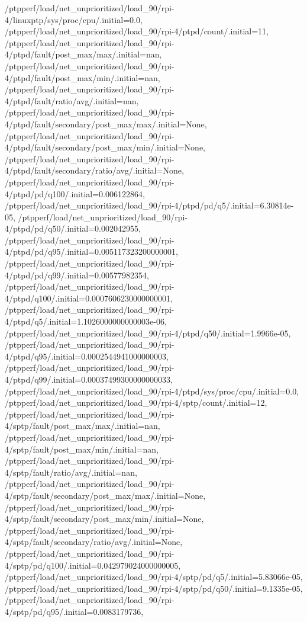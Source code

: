 {    /ptpperf/load/net_unprioritized/load_90/rpi-4/linuxptp/sys/proc/cpu/.initial=0.0,
    /ptpperf/load/net_unprioritized/load_90/rpi-4/ptpd/count/.initial=11,
    /ptpperf/load/net_unprioritized/load_90/rpi-4/ptpd/fault/post_max/max/.initial=nan,
    /ptpperf/load/net_unprioritized/load_90/rpi-4/ptpd/fault/post_max/min/.initial=nan,
    /ptpperf/load/net_unprioritized/load_90/rpi-4/ptpd/fault/ratio/avg/.initial=nan,
    /ptpperf/load/net_unprioritized/load_90/rpi-4/ptpd/fault/secondary/post_max/max/.initial=None,
    /ptpperf/load/net_unprioritized/load_90/rpi-4/ptpd/fault/secondary/post_max/min/.initial=None,
    /ptpperf/load/net_unprioritized/load_90/rpi-4/ptpd/fault/secondary/ratio/avg/.initial=None,
    /ptpperf/load/net_unprioritized/load_90/rpi-4/ptpd/pd/q100/.initial=0.006122864,
    /ptpperf/load/net_unprioritized/load_90/rpi-4/ptpd/pd/q5/.initial=6.30814e-05,
    /ptpperf/load/net_unprioritized/load_90/rpi-4/ptpd/pd/q50/.initial=0.002042955,
    /ptpperf/load/net_unprioritized/load_90/rpi-4/ptpd/pd/q95/.initial=0.005117323200000001,
    /ptpperf/load/net_unprioritized/load_90/rpi-4/ptpd/pd/q99/.initial=0.00577982354,
    /ptpperf/load/net_unprioritized/load_90/rpi-4/ptpd/q100/.initial=0.0007606230000000001,
    /ptpperf/load/net_unprioritized/load_90/rpi-4/ptpd/q5/.initial=1.1026000000000003e-06,
    /ptpperf/load/net_unprioritized/load_90/rpi-4/ptpd/q50/.initial=1.9966e-05,
    /ptpperf/load/net_unprioritized/load_90/rpi-4/ptpd/q95/.initial=0.0002544941000000003,
    /ptpperf/load/net_unprioritized/load_90/rpi-4/ptpd/q99/.initial=0.00037499300000000033,
    /ptpperf/load/net_unprioritized/load_90/rpi-4/ptpd/sys/proc/cpu/.initial=0.0,
    /ptpperf/load/net_unprioritized/load_90/rpi-4/sptp/count/.initial=12,
    /ptpperf/load/net_unprioritized/load_90/rpi-4/sptp/fault/post_max/max/.initial=nan,
    /ptpperf/load/net_unprioritized/load_90/rpi-4/sptp/fault/post_max/min/.initial=nan,
    /ptpperf/load/net_unprioritized/load_90/rpi-4/sptp/fault/ratio/avg/.initial=nan,
    /ptpperf/load/net_unprioritized/load_90/rpi-4/sptp/fault/secondary/post_max/max/.initial=None,
    /ptpperf/load/net_unprioritized/load_90/rpi-4/sptp/fault/secondary/post_max/min/.initial=None,
    /ptpperf/load/net_unprioritized/load_90/rpi-4/sptp/fault/secondary/ratio/avg/.initial=None,
    /ptpperf/load/net_unprioritized/load_90/rpi-4/sptp/pd/q100/.initial=0.042979024000000005,
    /ptpperf/load/net_unprioritized/load_90/rpi-4/sptp/pd/q5/.initial=5.83066e-05,
    /ptpperf/load/net_unprioritized/load_90/rpi-4/sptp/pd/q50/.initial=9.1335e-05,
    /ptpperf/load/net_unprioritized/load_90/rpi-4/sptp/pd/q95/.initial=0.0083179736,
}
